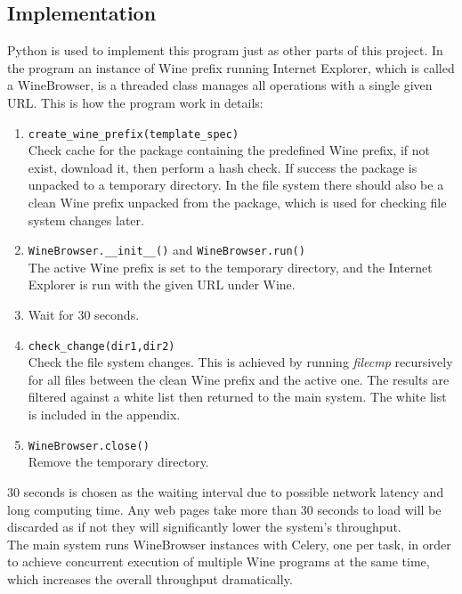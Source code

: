 \subsection{Implementation}
Python is used to implement this program just as other parts of this project. 
In the program an instance of Wine prefix running Internet Explorer, which is called 
a WineBrowser, is a threaded class manages all operations with a single 
given URL. This is how the program work in details:
\begin{enumerate}
\item \verb`create_wine_prefix(template_spec)` \\
Check cache for the package containing the predefined Wine prefix, if not 
exist, download it, then perform a hash check.
If success the package is unpacked to a temporary directory. 
In the file system there should also be a clean Wine prefix unpacked from the 
package, which is used for checking file system changes later. 
\item \verb`WineBrowser.__init__()` and \verb`WineBrowser.run()`\\
The active Wine prefix is set to the temporary directory, and the Internet 
Explorer is run with the given URL under Wine. 
\item
Wait for 30 seconds.
\item \verb`check_change(dir1,dir2)`\\
Check the file system changes. This is achieved by running {\em filecmp} recursively 
for all files between the clean Wine prefix and the active one. The results 
are filtered against a white list then returned to the main system. The white 
list is included in the appendix.%
\item \verb`WineBrowser.close()`\\
Remove the temporary directory. 
\end{enumerate}
30 seconds is chosen as the waiting interval due to possible network 
latency and long computing time. Any web pages take more than 30 seconds to 
load will be discarded as if not they will significantly lower the system's 
throughput. \\
The main system runs WineBrowser instances with Celery, one per task, in order 
to achieve concurrent execution of multiple Wine programs at the same time, 
which increases the overall throughput dramatically. 
